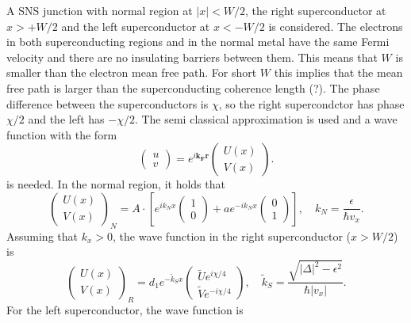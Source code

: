 A SNS junction with normal region at $|x| < W/2$, the right superconductor at $x > + W/2$ and the left superconductor at $x < -W/2$ is considered. The electrons in both superconducting regions and in the normal metal have the same Fermi velocity and there are no insulating barriers between them. This means that $W$  is smaller than the electron mean free path. For short $W$ this implies that the mean free path is larger than the superconducting coherence length (?). The phase difference between the superconductors is $\chi$, so the right supercondctor has phase $\chi/2$ and the left has $-\chi/2$. 
The semi classical approximation is used and a wave function with the form
\begin{equation}
\begin{pmatrix} u \\ v \end{pmatrix} = e^{i \mathbf{k_F} \mathbf{r} } \begin{pmatrix} U (x) \\ V(x) \end{pmatrix}.
\end{equation}
is needed.\newline
In the normal region, it holds that 
\begin{equation}
\begin{pmatrix} U(x) \\ V(x) \end{pmatrix}_N = A\cdot \left[ e^{i k_N x } \begin{pmatrix} 1 \\ 0 \end{pmatrix} + a e^{-i k_N x } \begin{pmatrix} 0 \\ 1 \end{pmatrix} \right], \quad k_N = \frac{\epsilon}{\hbar v_x}.
\end{equation}
Assuming that $k_x > 0$, the wave function in the right superconductor ($x > W/2$) is
\begin{equation}
\begin{pmatrix} U(x) \\ V(x) \end{pmatrix}_R = d_1 e^{ - \tilde{k}_S x } \begin{pmatrix} \tilde{U} e^{i \chi/4} \\ \tilde{V} e^{-i \chi/4} \end{pmatrix}, \quad \tilde{k}_S  = \frac{\sqrt{|\Delta|^2 - \epsilon^2 }}{\hbar |v_x|}.
\end{equation}
For the left superconductor, the wave function is
